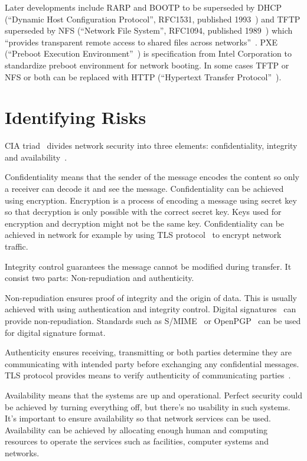 Later developments include RARP and BOOTP to be superseded by DHCP
(``Dynamic Host Configuration Protocol'', RFC1531, published
1993~\cite{RFC1531}) and TFTP superseded by NFS (``Network File
System'', RFC1094, published 1989~\cite{RFC1094}) which ``provides
transparent remote access to shared files across
networks''~\cite{RFC1094}. PXE (``Preboot Execution
Environment''~\cite{PXEspec}) is specification from Intel Corporation
to standardize preboot environment for network booting. In some cases
TFTP or NFS or both can be replaced with HTTP (``Hypertext Transfer
Protocol''~\cite{RFC1945}\cite{RFC2616}).


\section{Identifying Risks}

CIA triad~\cite{cia-triad} divides network security into three
elements: confidentiality, integrity and availability~\cite{anderson}.

Confidentiality means that the sender of the message encodes the
content so only a receiver can decode it and see the
message. Confidentiality can be achieved using encryption. Encryption
is a process of encoding a message using secret key so that decryption
is only possible with the correct secret key. Keys used for encryption
and decryption might not be the same key. Confidentiality can be
achieved in network for example by using TLS protocol~\cite{RFC5246}
to encrypt network traffic.

Integrity control guarantees the message cannot be modified during
transfer. It consist two parts: Non-repudiation and authenticity.

Non-repudiation ensures proof of integrity and the origin of
data. This is usually achieved with using authentication and integrity
control. Digital signatures~\cite{Diffie2006}\cite{Goldwasser1988} can
provide non-repudiation. Standards such as S/MIME~\cite{RFC5751} or
OpenPGP~\cite{RFC4880} can be used for digital signature format.

Authenticity ensures receiving, transmitting or both parties determine
they are communicating with intended party before exchanging any
confidential messages. TLS protocol provides means to verify
authenticity of communicating parties~\cite{RFC5246}.

Availability means that the systems are up and operational. Perfect
security could be achieved by turning everything off, but there's no
usability in such systems. It's important to ensure availability so
that network services can be used. Availability can be achieved by
allocating enough human and computing resources to operate the
services such as facilities, computer systems and networks.

